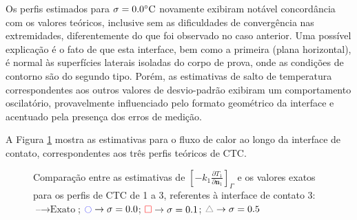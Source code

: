 Os perfis estimados para $\sigma = 0.0\celsius$ novamente exibiram notável concordância com os valores teóricos, inclusive sem as dificuldades de convergência nas extremidades, diferentemente do que foi observado no caso anterior. Uma possível explicação é o fato de que esta interface, bem como a primeira (plana horizontal), é normal às superfícies laterais isoladas do corpo de prova, onde as condições de contorno são do segundo tipo. Porém, as estimativas de salto de temperatura correspondentes aos outros valores de desvio-padrão exibiram um comportamento oscilatório, provavelmente influenciado pelo formato geométrico da interface e acentuado pela presença dos erros de medição.
%
%

A Figura \ref{figura_fluxo_calor_interface_03} mostra as estimativas para o fluxo de calor ao longo da interface de contato, correspondentes aos três perfis teóricos de CTC.

\begin{figure}[H]
	\caption{Comparação entre as estimativas de $\left[-k_1 \frac{\partial T_1}{\partial\mathbf{n}_1}\right]_\Gamma$ e os valores exatos para os perfis de CTC de 1 a 3, referentes à interface de contato 3: $\text{--} \rightarrow \text{Exato}$; $\textcolor{blue}{\ocircle} \rightarrow \sigma = 0.0$; $\textcolor{red}{\square} \rightarrow \sigma = 0.1$; $\textcolor{gray}{\triangle} \rightarrow \sigma = 0.5$}
	\label{figura_fluxo_calor_interface_03}
\end{figure}

